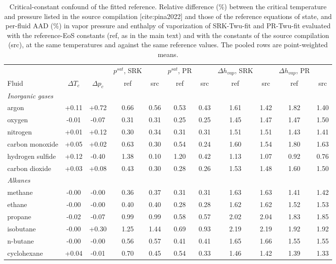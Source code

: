 \begin{table}[H]
\centering
\caption{Critical-constant confound of the fitted reference. Relative difference (\%) between the critical temperature and pressure listed in the source compilation [cite:pina2022] and those of the reference equations of state, and per-fluid AAD (\%) in vapor pressure and enthalpy of vaporization of SRK-Twu-fit and PR-Twu-fit evaluated with the reference-EoS constants (ref, as in the main text) and with the constants of the source compilation (src), at the same temperatures and against the same reference values. The pooled rows are point-weighted means.}
\label{tab:tabS_twufit_src}
\small
\begin{tabular}{lcccccccccc}
\toprule
 &  &  & $p^{sat}$, SRK &  & $p^{sat}$, PR &  & $\Delta h_{vap}$, SRK &  & $\Delta h_{vap}$, PR &  \\
Fluid & $\Delta T_c$ & $\Delta p_c$ & ref & src & ref & src & ref & src & ref & src \\
\midrule
\multicolumn{11}{l}{\emph{Inorganic gases}} \\
argon & +0.11 & +0.72 & 0.66 & 0.56 & 0.53 & 0.43 & 1.61 & 1.42 & 1.82 & 1.40 \\
oxygen & -0.01 & -0.07 & 0.31 & 0.31 & 0.25 & 0.25 & 1.45 & 1.47 & 1.47 & 1.50 \\
nitrogen & +0.01 & +0.12 & 0.30 & 0.34 & 0.31 & 0.31 & 1.51 & 1.51 & 1.43 & 1.41 \\
carbon monoxide & +0.05 & +0.02 & 0.63 & 0.30 & 0.54 & 0.24 & 1.60 & 1.54 & 1.80 & 1.63 \\
hydrogen sulfide & +0.12 & -0.40 & 1.38 & 0.10 & 1.20 & 0.42 & 1.13 & 1.07 & 0.92 & 0.76 \\
carbon dioxide & +0.03 & +0.08 & 0.43 & 0.30 & 0.28 & 0.26 & 1.53 & 1.48 & 1.60 & 1.50 \\
\multicolumn{11}{l}{\emph{Alkanes}} \\
methane & -0.00 & -0.00 & 0.36 & 0.37 & 0.31 & 0.31 & 1.63 & 1.63 & 1.41 & 1.42 \\
ethane & -0.00 & -0.00 & 0.40 & 0.40 & 0.28 & 0.28 & 1.62 & 1.62 & 1.52 & 1.53 \\
propane & -0.02 & -0.07 & 0.99 & 0.99 & 0.58 & 0.57 & 2.02 & 2.04 & 1.83 & 1.85 \\
isobutane & -0.00 & +0.30 & 1.25 & 1.44 & 0.69 & 0.93 & 2.19 & 2.19 & 1.92 & 1.92 \\
n-butane & -0.00 & -0.00 & 0.56 & 0.57 & 0.41 & 0.41 & 1.65 & 1.66 & 1.55 & 1.55 \\
cyclohexane & +0.04 & -0.01 & 0.70 & 0.45 & 0.54 & 0.33 & 1.46 & 1.42 & 1.39 & 1.33 \\

\end{tabular}
\end{table}
